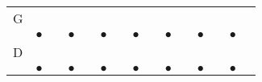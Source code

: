 \documentclass[landscape]{foils}
\begin{document}
{\begin{center}
\begin{tabular}{lclclclclclclcl}
G  & {\color{black} $$} &     & {\color{black} $$ } &     & {\color{black} $$ } & {\color{black} $$} &     & {\color{black} $$ } &     & {\color{black} $$ } & {\color{black} $$} &     & {\color{black} $$ } &       \\   & {\color{black} $\bullet$}      &    & {\color{black} $\bullet$}        &    & {\color{black}$\bullet$} &    & {\color{black}$\bullet$}&    & {\color{black}$\bullet$}&    & {\color{black}$\bullet$}&    & {\color{black}$\bullet$} \\
D  & {\color{black} $$} &     & {\color{black} $$ } &     & {\color{black} $$ } & {\color{black} $$} &     & {\color{black} $$ } &     & {\color{black} $$ } & {\color{black} $$} &     & {\color{black} $$ } &       \\   & {\color{black} $\bullet$}      &    & {\color{black} $\bullet$}        &    & {\color{black}$\bullet$} &    & {\color{black}$\bullet$}&    & {\color{black}$\bullet$}&    & {\color{black}$\bullet$}&    & {\color{black}$\bullet$} \\
\end{tabular}
\end{center}
}
\end{document}
